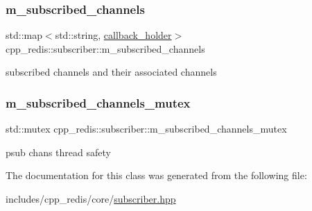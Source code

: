 \subsubsection{\texorpdfstring{m\+\_\+subscribed\+\_\+channels}{m\_subscribed\_channels}}
{\footnotesize\ttfamily std\+::map$<$std\+::string, \hyperlink{structcpp__redis_1_1subscriber_1_1callback__holder}{callback\+\_\+holder}$>$ cpp\+\_\+redis\+::subscriber\+::m\+\_\+subscribed\+\_\+channels\hspace{0.3cm}{\ttfamily [private]}}

subscribed channels and their associated channels \mbox{\label{classcpp__redis_1_1subscriber_ae46b99f9ff06e2a05daca6273ffbb155}} 
\subsubsection{\texorpdfstring{m\+\_\+subscribed\+\_\+channels\+\_\+mutex}{m\_subscribed\_channels\_mutex}}
{\footnotesize\ttfamily std\+::mutex cpp\+\_\+redis\+::subscriber\+::m\+\_\+subscribed\+\_\+channels\+\_\+mutex\hspace{0.3cm}{\ttfamily [private]}}

psub chans thread safety 

The documentation for this class was generated from the following file\+:\begin{DoxyCompactItemize}
\item 
includes/cpp\+\_\+redis/core/\hyperlink{subscriber_8hpp}{subscriber.\+hpp}\end{DoxyCompactItemize}
